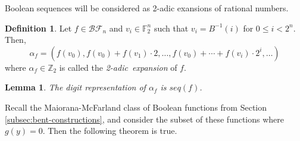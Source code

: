 \documentclass[english]{article}
\def\zzz{\mathbb{Z}}
\def\gftwo{\mathbb{F}_2}
\def\BF{\mathcal{BF}}
\theoremstyle{plain}
\newtheorem{lemma}[theorem]{Lemma}%
\theoremstyle{definition}
\newtheorem{definition}[theorem]{Definition}%
\theoremstyle{remark}
\begin{document}
\par Boolean sequences will be considered as 2-adic exansions of rational
numbers.

\begin{definition}\label{2-adic-ex}
  Let $f\in\BF_n$ and $v_i\in\gftwo^n$ such that $v_i=B^{-1}(i)$ for
  $0\leq i<2^n$. Then,
  \begin{equation}
    \alpha_f=(f(v_0),f(v_0)+f(v_1)\cdot2,\dots,\allowbreak
      f(v_0)+\cdots\allowbreak+f(v_i)\cdot2^i,\allowbreak\dots)
  \end{equation}
  where $\alpha_f\in\zzz_2$ is called the {\em 2-adic\ expansion} of $f$.
\end{definition}

\begin{lemma}
  The digit representation of $\alpha_f$ is $seq(f)$.
\end{lemma}

\par Recall the Maiorana-McFarland class of Boolean functions from Section
\ref{subsec:bent-constructions}, and consider
the subset of these functions where $g(y)=0$. Then the following theorem is
true.
\end{document}
